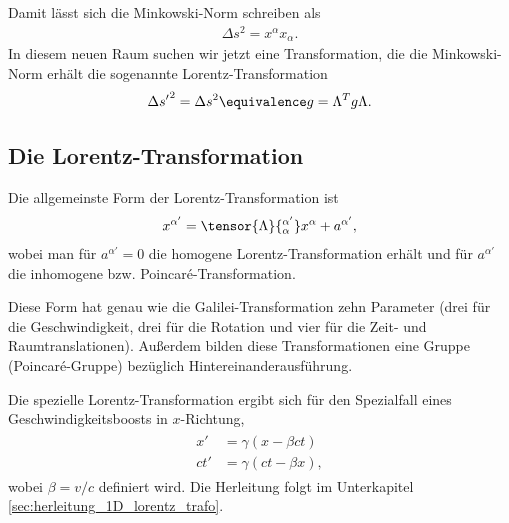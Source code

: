 Damit lässt sich die Minkowski-Norm schreiben als
\begin{align*}
    \Delta s^2=x^\alpha x_\alpha.
\end{align*}
In diesem neuen Raum suchen wir jetzt eine Transformation, die die Minkowski-Norm erhält \textendash{} die sogenannte Lorentz-Transformation
\begin{align*}
    {\Delta s'}^2 = \Delta s^2 \equivalence g=\Lambda^T g\Lambda.
\end{align*}



\subsection{Die Lorentz-Transformation}

Die allgemeinste Form der Lorentz-Transformation ist
\begin{align*}
    x^{\alpha'}=\tensor{\Lambda}{^{\alpha'}_\alpha}x^\alpha+a^{\alpha'},
\end{align*}
wobei man für $a^{\alpha'}=0$ die homogene Lorentz-Transformation erhält und für $a^{\alpha'}$ die inhomogene bzw. Poincaré-Transformation.

Diese Form hat genau wie die Galilei-Transformation zehn Parameter (drei für die Geschwindigkeit, drei für die Rotation und vier für die Zeit- und Raumtranslationen).
Außerdem bilden diese Transformationen eine Gruppe (Poincaré-Gruppe) bezüglich Hintereinanderausführung.

Die spezielle Lorentz-Transformation ergibt sich für den Spezialfall eines Geschwindigkeitsboosts in $x$-Richtung,
\begin{align}
    \label{eq:spezielle_lorentz_trafo}
    \begin{split}
        x'  & = \gamma(x-\beta ct)   \\
        ct' & = \gamma (ct-\beta x),
    \end{split}
\end{align}
wobei $\beta=v/c$ definiert wird. Die Herleitung folgt im Unterkapitel \ref{sec:herleitung_1D_lorentz_trafo}.

